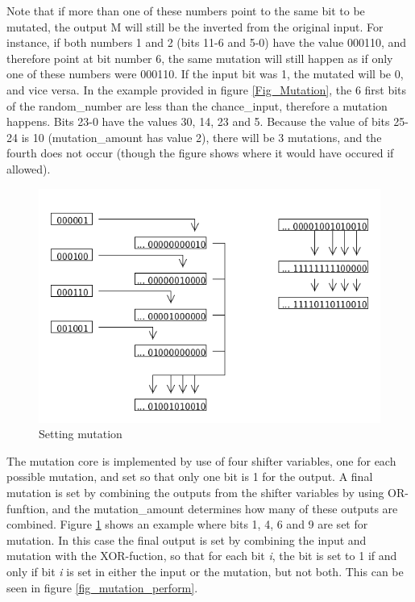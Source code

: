 Note that if more than one of these numbers point to the same bit to be mutated, the output M will still be the inverted from the original input. For instance, if both numbers 1 and 2 (bits 11-6 and 5-0) have the value 000110, and therefore point at bit number 6, the same mutation will still happen as if only one of these numbers were 000110. If the input bit was 1, the mutated will be 0, and vice versa.
In the example provided in figure \ref{Fig_Mutation}, the 6 first bits of the random\_number are less than the chance\_input, therefore a mutation happens. Bits 23-0 have the values 30, 14, 23 and 5. Because the value of bits 25-24 is 10 (mutation\_amount has value 2), there will be 3 mutations, and the fourth does not occur (though the figure shows where it would have occured if allowed).

\begin{figure}[H]
\includegraphics[width=\textwidth]{fpga/fig/mutation_mask.png}
\caption{Setting mutation}
\label{fig_mutation_mask}
\end{figure}

The mutation core is implemented by use of four shifter variables, one for each possible mutation, and set so that only one bit is 1 for the output. A final mutation is set by combining the outputs from the shifter variables by using OR-funftion, and the mutation\_amount determines how many of these outputs are combined. Figure \ref{fig_mutation_mask} shows an example where bits 1, 4, 6 and 9 are set for mutation. In this case the final output is set by combining the input and mutation with the XOR-fuction, so that for each bit \emph{i}, the bit is set to 1 if and only if bit \emph{i} is set in either the input or the mutation, but not both. This can be seen in figure \ref{fig_mutation_perform}.


